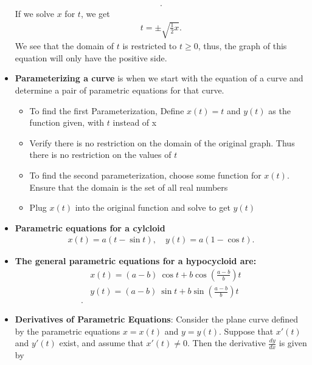 \documentclass{report}
\begin{document}
\begin{itemize}
\begin{align*}
            .\end{align*}
            If we solve $x$ for $t$, we get 
            \begin{align*}
                 t = \pm \sqrt{\frac{1}{2}x}
            .\end{align*}
            We see that the domain of $t$ is restricted to  $t \geq 0$, thus, the graph of this equation will only have the positive side.
        \item \textbf{Parameterizing a curve} is when we start with the equation of a curve and determine a pair of parametric equations for that curve.
            \begin{itemize}
                \item To find the first Parameterization, Define $x(t) = t $ and $y(t)$ as the function given, with $t$ instead of x 
                \item Verify there is no restriction on the domain of the original graph. Thus there is no restriction on the values of $t $
            \end{itemize}
            \begin{itemize}
                \item To find the second parameterization, choose some function for $x(t)$. Ensure that the domain is the set of all real numbers
                \item Plug $x(t)$ into the original function and solve to get $y(t)$
            \end{itemize}
        \item \textbf{Parametric equations for a cylcloid}
            \begin{align*}
                x(t) = a(t-\sin{t}), \quad y(t) = a(1-\cos{t})
            .\end{align*}
        \item \textbf{The general parametric equations for a hypocycloid are:}
            \begin{align*}
                &x(t) = (a-b)\ \cos{t} + b \cos{\left(\frac{a-b}{b}\right)}t \\
                &y(t) = (a-b)\ \sin{t} + b \sin{\left(\frac{a-b}{b}\right)}t \\
            .\end{align*}
        \item \textbf{Derivatives of Parametric Equations}:
            Consider the plane curve defined by the parametric equations \( x = x(t) \) and \( y = y(t) \). Suppose that \( x'(t) \) and \( y'(t) \) exist, and assume that \( x'(t) \neq 0 \). Then the derivative \( \frac{dy}{dx} \) is given by

\end{itemize}
\end{document}
